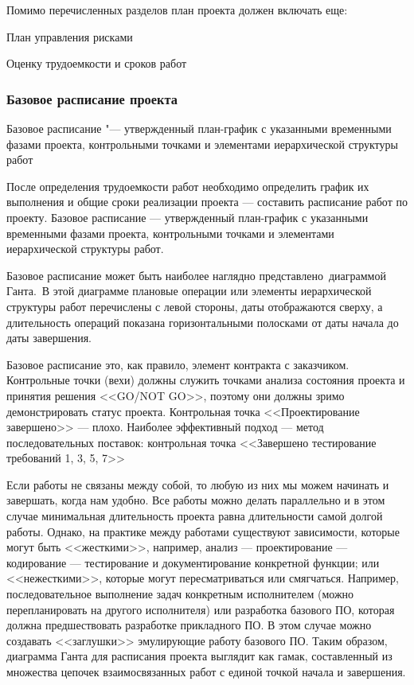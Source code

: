 \documentclass{../industrial-development}
\begin{document}
Помимо перечисленных разделов план проекта должен включать еще:

План управления рисками

Оценку трудоемкости и сроков работ


    \begin{frame} \frametitle{Базовое расписание проекта}
        \begin{definition}
            \alert{Базовое расписание} "--- утвержденный план-график с указанными временными фазами проекта, контрольными точками и элементами иерархической структуры работ
        \end{definition}
    \end{frame}
    \lecturenotes
После определения трудоемкости работ необходимо определить график их выполнения и общие сроки реализации проекта — составить расписание работ по проекту. Базовое расписание — утвержденный план-график с указанными временными фазами проекта, контрольными точками и элементами иерархической структуры работ.

Базовое расписание может быть наиболее наглядно представлено диаграммой Ганта. В этой диаграмме плановые операции или элементы иерархической структуры работ перечислены с левой стороны, даты отображаются сверху, а длительность операций показана горизонтальными полосками от даты начала до даты завершения.

Базовое расписание это, как правило, элемент контракта с заказчиком. Контрольные точки (вехи) должны служить точками анализа состояния проекта и принятия решения <<GO/NOT GO>>, поэтому они должны зримо демонстрировать статус проекта. Контрольная точка <<Проектирование завершено>> — плохо. Наиболее эффективный подход — метод последовательных поставок: контрольная точка <<Завершено тестирование требований 1, 3, 5, 7>>

Если работы не связаны между собой, то любую из них мы можем начинать и завершать, когда нам удобно. Все работы можно делать параллельно и в этом случае минимальная длительность проекта равна длительности самой долгой работы. Однако, на практике между работами существуют зависимости, которые могут быть <<жесткими>>, например, анализ — проектирование — кодирование — тестирование и документирование конкретной функции; или <<нежесткими>>, которые могут пересматриваться или смягчаться. Например, последовательное выполнение задач конкретным исполнителем (можно перепланировать на другого исполнителя) или разработка базового ПО, которая должна предшествовать разработке прикладного ПО. В этом случае можно создавать <<заглушки>> эмулирующие работу базового ПО. Таким образом, диаграмма Ганта для расписания проекта выглядит как гамак, составленный из множества цепочек взаимосвязанных работ с единой точкой начала и завершения.
\end{document}
